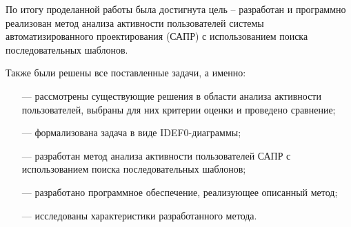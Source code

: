 По итогу проделанной работы была достигнута цель -- разработан и программно реализован метод анализа активности пользователей системы автоматизированного проектирования (САПР) с использованием поиска последовательных шаблонов.

Также были решены все поставленные задачи, а именно:

\begin{itemize}
	\item[---] рассмотрены существующие решения в области анализа активности пользователей, выбраны для них критерии оценки и проведено сравнение;
	\item[---] формализована задача в виде IDEF0-диаграммы;
	\item[---] разработан метод анализа активности пользователей САПР с использованием поиска последовательных шаблонов; %
	\item[---] разработано программное обеспечение, реализующее описанный метод;
	\item[---] исследованы характеристики разработанного метода.
\end{itemize}